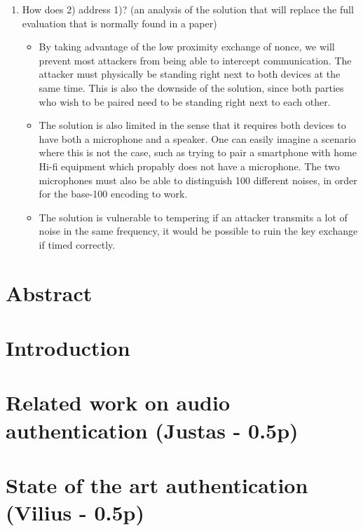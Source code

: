 \documentclass[12pt]{article}
\begin{document}
\begin{enumerate}
    \item How does 2) address 1)?  (an analysis of the solution that will replace the full evaluation that is normally found in a paper)

    \begin{itemize}
        \item By taking advantage of the low proximity exchange of nonce, we will prevent most attackers from being able to intercept communication. The attacker must physically be standing right next to both devices at the same time.
        This is also the downside of the solution, since both parties who wish to be paired need to be standing right next to each other.
        \item The solution is also limited in the sense that it requires both devices to have both a microphone and a speaker. One can easily imagine a scenario where this is not the case, such as trying to pair a smartphone with home Hi-fi equipment which propably does not have a microphone. The two microphones must also be able to distinguish 100 different noises, in order for the base-100 encoding to work.
        \item The solution is vulnerable to tempering if an attacker transmits a lot of noise in the same frequency, it would be possible to ruin the key exchange if timed correctly.
    \end{itemize}

\end{enumerate}

\newpage

\section{Abstract}
\label{sec:Abstract}

\newpage

\section{Introduction}
\label{sec:Introduction}

\newpage

\section{Related work on audio authentication (Justas - 0.5p)}
\label{sec:Related work on audio authentication}

\section{State of the art authentication (Vilius - 0.5p)}
\label{sec:State of the art authentication}
\end{document}
